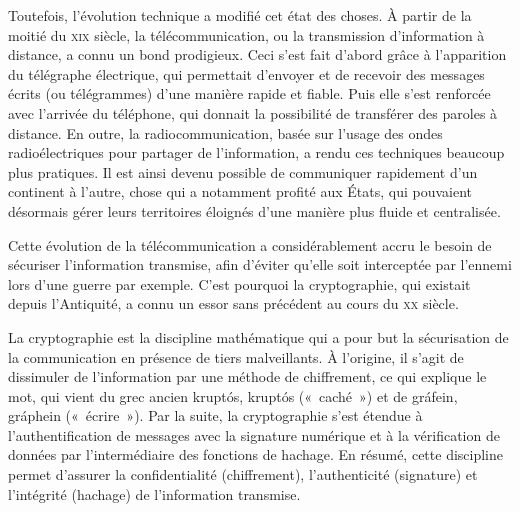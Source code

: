 Toutefois, l'évolution technique a modifié cet état des choses. À partir de la moitié du \textsc{xix}\ieme{} siècle, la télécommunication, ou la transmission d'information à distance, a connu un bond prodigieux. Ceci s'est fait d'abord grâce à l'apparition du télégraphe électrique, qui permettait d'envoyer et de recevoir des messages écrits (ou télégrammes) d'une manière rapide et fiable. Puis elle s'est renforcée avec l'arrivée du téléphone, qui donnait la possibilité de transférer des paroles à distance. En outre, la radiocommunication, basée sur l'usage des ondes radioélectriques pour partager de l'information, a rendu ces techniques beaucoup plus pratiques. Il est ainsi devenu possible de communiquer rapidement d'un continent à l'autre, chose qui a notamment profité aux États, qui pouvaient désormais gérer leurs territoires éloignés d'une manière plus fluide et centralisée. %

Cette évolution de la télécommunication a considérablement accru le besoin de sécuriser l'information transmise, afin d'éviter qu'elle soit interceptée par l'ennemi lors d'une guerre par exemple. C'est pourquoi la cryptographie, qui existait depuis l'Antiquité, a connu un essor sans précédent au cours du \textsc{xx}\ieme{} siècle.


La cryptographie est la discipline mathématique qui a pour but la sécurisation de la communication en présence de tiers malveillants. À l'origine, il s'agit de dissimuler de l'information par une méthode de chiffrement, ce qui explique le mot, qui vient du grec ancien \foreignlanguage{greek}{kruptós}, kruptós («~caché~») et de \foreignlanguage{greek}{gráfein}, gráphein («~écrire~»). Par la suite, la cryptographie s'est étendue à l'authentification de messages avec la signature numérique et à la vérification de données par l'intermédiaire des fonctions de hachage. En résumé, cette discipline permet d'assurer la confidentialité (chiffrement), l'authenticité (signature) et l'intégrité (hachage) de l'information transmise.


